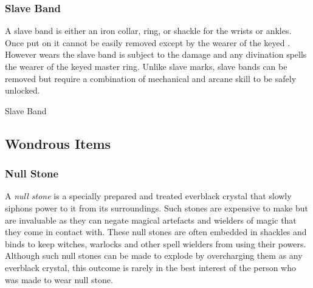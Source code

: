 \subsubsection{Slave Band}
\label{sec:Slave Band}

A slave band is either an iron collar, ring, or shackle for the wrists or
ankles. Once put on it cannot be easily removed except by the wearer of the
keyed . However wears the slave band is subject to
the damage and any divination spells the wearer of the keyed master ring.
Unlike slave marks, slave bands can be removed but require a combination of
mechanical and arcane skill to be safely unlocked.

\begin{35e}{Slave Band}
\end{35e}

\subsection{Wondrous Items}
\label{sec:Wondrous Items}

\subsubsection{Null Stone}
\label{sec:Null Stone}

A \emph{null stone} is a specially prepared and treated everblack crystal that
slowly siphons power to it from its surroundings. Such stones are expensive to
make but are invaluable as they can negate magical artefacts and wielders of
magic that they come in contact with. These null stones are often embedded in
shackles and binds to keep witches, warlocks and other spell wielders from
using their powers. Although such null stones can be made to explode by
overcharging them as any everblack crystal, this outcome is rarely in the best
interest of the person who was made to wear null stone.

